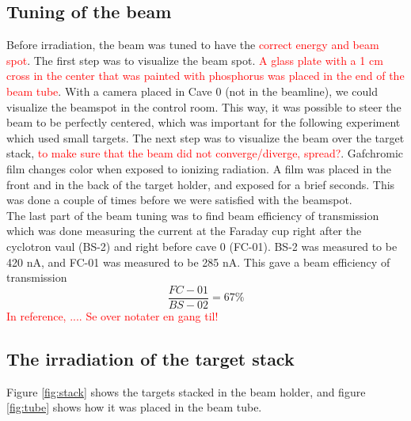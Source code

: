 \subsection{Tuning of the beam}
Before irradiation, the beam was tuned to have the \textcolor{red}{correct energy and beam spot}. The first step was to visualize the beam spot. \textcolor{red}{A glass plate with a 1 cm cross in the center that was painted with phosphorus was placed in the end of the beam tube}. With a camera placed in Cave 0 (not in the beamline), we could visualize the beamspot in the control room. This way, it was possible to steer the beam to be perfectly centered, which was important for the following experiment which used small targets. The next step was to visualize the beam over the target stack, \textcolor{red}{to make sure that the beam did not converge/diverge, spread?}. Gafchromic film changes color when exposed to ionizing radiation. A film was placed in the front and in the back of the target holder, and exposed for a brief seconds. This was done a couple of times before we were satisfied with the beamspot. \\

\noindent 
The last part of the beam tuning was to find beam efficiency of transmission which was done measuring the current at the Faraday cup right after the cyclotron vaul (BS-2) and right before cave 0 (FC-01). BS-2 was measured to be 420 nA, and FC-01 was measured to be 285 nA. This gave a beam efficiency of transmission
\begin{equation*}
    \frac{FC-01}{BS-02}=67\%
\end{equation*}
\noindent 
\textcolor{red}{In reference, .... Se over notater en gang til!}

\subsection{The irradiation of the target stack}

Figure \ref{fig:stack} shows the targets stacked in the beam holder, and figure \ref{fig:tube} shows how it was placed in the beam tube. 

